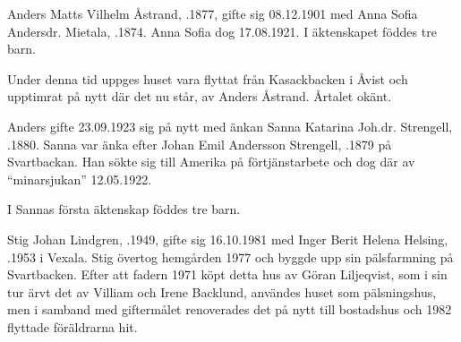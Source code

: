 Anders Matts Vilhelm Åstrand, .1877, gifte sig 08.12.1901 med Anna Sofia Andersdr. Mietala, .1874. Anna Sofia dog 17.08.1921. I äktenskapet föddes tre barn.
\begin{jhchildren}
  \item {}
  \item {}
  \item {}
\end{jhchildren}

Under denna tid uppges huset vara flyttat från Kasackbacken i Åvist och upptimrat på nytt där det nu står, av Anders Åstrand. Årtalet okänt.

Anders gifte 23.09.1923 sig på nytt med änkan Sanna Katarina Joh.dr. Strengell, .1880. Sanna var änka efter Johan Emil Andersson Strengell, .1879 på Svartbackan. Han sökte sig till Amerika på förtjänstarbete och dog där av ``minarsjukan'' 12.05.1922.

I Sannas första äktenskap föddes tre barn.
\begin{jhchildren}
  \item {}
  \item {}
  \item {}
\end{jhchildren}






Stig Johan Lindgren, .1949, gifte sig 16.10.1981 med Inger Berit Helena Helsing, .1953 i Vexala. Stig övertog hemgården 1977 och byggde upp sin pälsfarmning på Svartbacken. Efter att fadern 1971 köpt detta hus av Göran Liljeqvist, som i sin tur ärvt det av Villiam och Irene Backlund, användes huset som pälsningshus, men i samband med giftermålet renoverades det på nytt till bostadshus och 1982 flyttade föräldrarna hit.


